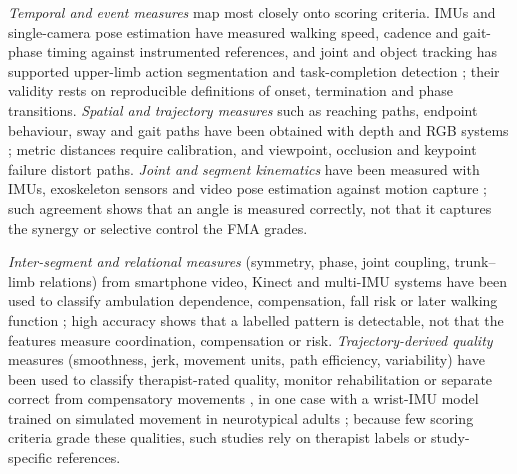 \documentclass[11pt]{article}
\begin{document}
\emph{Temporal and event measures} map most closely onto scoring criteria. IMUs and single-camera pose estimation have measured walking speed, cadence and gait-phase timing against instrumented references, and joint and object tracking has supported upper-limb action segmentation and task-completion detection \cite{Yang2013SpatiotemporalGait,S3Lonini202235224426,S3Stenum202438530801,Ahmed2021AutomatedMovement}; their validity rests on reproducible definitions of onset, termination and phase transitions. \emph{Spatial and trajectory measures} such as reaching paths, endpoint behaviour, sway and gait paths have been obtained with depth and RGB systems \cite{Scano2018KinectReaching,Proffitt2023DepthMovement,Zamin2023BIONICS,S3Stenum202438530801}; metric distances require calibration, and viewpoint, occlusion and keypoint failure distort paths. \emph{Joint and segment kinematics} have been measured with IMUs, exoskeleton sensors and video pose estimation against motion capture \cite{Held2018UpperLimbIMU,Grimm2021KinematicValidation,Formstone2021IMUMMG,S3John202437682075}; such agreement shows that an angle is measured correctly, not that it captures the synergy or selective control the FMA grades.

\emph{Inter-segment and relational measures} (symmetry, phase, joint coupling, trunk--limb relations) from smartphone video, Kinect and multi-IMU systems have been used to classify ambulation dependence, compensation, fall risk or later walking function \cite{Lee2021SmartphoneVideoAmbulation,Zhi2018CompensationDetection,S3Abdollahi202438339529,S3OBrien202236304845}; high accuracy shows that a labelled pattern is detectable, not that the features measure coordination, compensation or risk. \emph{Trajectory-derived quality} measures (smoothness, jerk, movement units, path efficiency, variability) have been used to classify therapist-rated quality, monitor rehabilitation or separate correct from compensatory movements \cite{Jung2017MovementQuality,Lu2021MotionFeaturesProgress,Proffitt2023DepthMovement,Lin2019ManualDexterity,Seo2024WearableQuality}, in one case with a wrist-IMU model trained on simulated movement in neurotypical adults \cite{Li2023DeepLearningTaskPractice}; because few scoring criteria grade these qualities, such studies rely on therapist labels or study-specific references.
\end{document}
